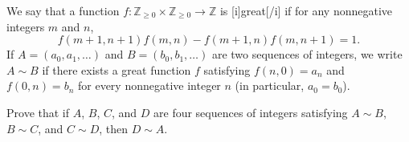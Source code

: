 We say that a function $f: \mathbb{Z}_{\ge 0} \times \mathbb{Z}_{\ge 0} \to \mathbb{Z}$ is [i]great[/i] if for any nonnegative integers $m$ and $n$,
\[f(m + 1, n + 1) f(m, n) - f(m + 1, n) f(m, n + 1) = 1.\]
If $A = (a_0, a_1, \dots)$ and $B = (b_0, b_1, \dots)$ are two sequences of integers, we write $A \sim B$ if there exists a great function $f$ satisfying $f(n, 0) = a_n$ and $f(0, n) = b_n$ for every nonnegative integer $n$ (in particular, $a_0 = b_0$).

Prove that if $A$, $B$, $C$, and $D$ are four sequences of integers satisfying $A \sim B$, $B \sim C$, and $C \sim D$, then $D \sim A$.